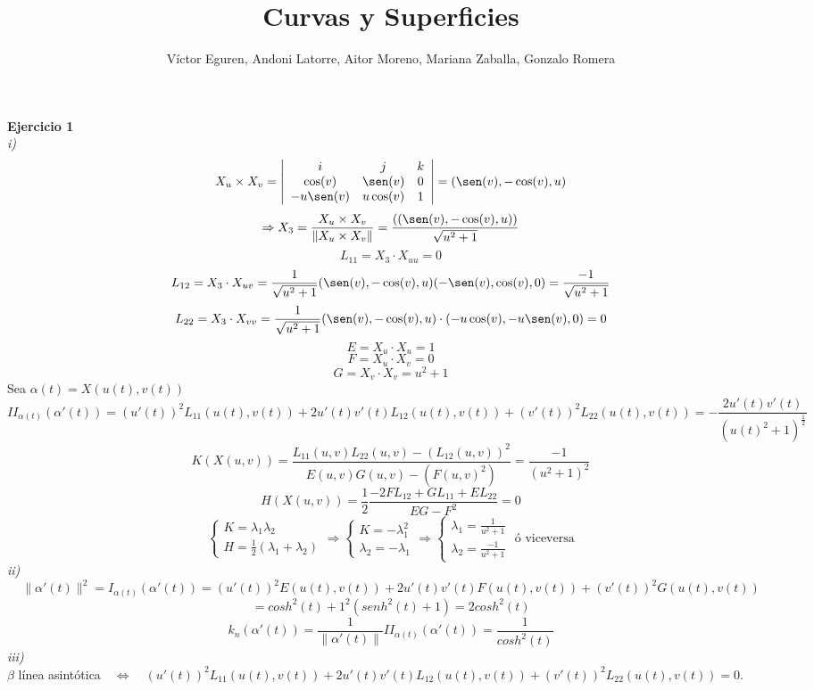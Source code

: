 \documentclass{article}
\title{Curvas y Superficies}
\author{Víctor Eguren, Andoni Latorre, Aitor Moreno, Mariana Zaballa, Gonzalo Romera}
\date{}
\begin{document}
\maketitle

\textbf{Ejercicio 1}\\
\textit{i)}
$$
X_u \times X_v = \left|\begin{array}{ccc}
    i & j & k \\
    \cos(v) & \sen(v) & 0 \\
    -u\sen(v) & u\cos(v) & 1    
\end{array}\right| = (\sen(v), -\cos(v),u)
$$
$$
\Rightarrow X_3 = \frac{X_u\times X_v}{\| X_u \times X_v\|} = \frac{((\sen(v), -\cos(v),u))}{\sqrt{u^2+1}}
$$
$$
L_{11} = X_3\cdot X_{uu} = 0
$$
$$
L_{12} = X_3\cdot X_{uv} = \frac{1}{\sqrt{u^2+1}} (\sen(v), -\cos(v),u) (-\sen(v), \cos(v), 0) = \frac{-1}{\sqrt{u^2+1}}
$$
$$
L_{22} = X_3\cdot X_{vv} = \frac{1}{\sqrt{u^2+1}} (\sen(v), -\cos(v),u) \cdot (-u\cos(v),-u\sen(v),0) = 0
$$
$$
E = X_u \cdot X_u = 1
$$
$$
F = X_u \cdot X_v = 0
$$
$$
G = X_v \cdot X_v = u^2 + 1
$$
Sea $\alpha(t)=X(u(t),v(t))$
$$
II_{\alpha(t)}(\alpha'(t))=(u'(t))^2L_{11}(u(t),v(t))+2u'(t)v'(t)L_{12}(u(t),v(t))+(v'(t))^2L_{22}(u(t),v(t))
= - \frac{2 u'(t) v'(t)}{(u(t)^2 +1)^{\frac{1}{2}}}
$$
$$
K(X(u,v))= \frac{L_{11}(u,v)L_{22}(u,v)-(L_{12}(u,v))^2}{E(u,v)G(u,v)-(F(u,v)^2)} = \frac{-1}{(u^2+1)^2}
$$
$$
H(X(u,v))= \frac{1}{2} \frac{-2FL_{12}+GL_{11}+EL_{22}}{EG-F^2}=0
$$
$$
\left\{\begin{array}{l}
    K=\lambda_1\lambda_2 \\
    H = \frac{1}{2}(\lambda_1+\lambda_2)
\end{array}\right.
\Rightarrow
\left\{ \begin{array}{l}
    K=-\lambda_1^2 \\
    \lambda_2 = - \lambda_1
\end{array}\right.
\Rightarrow
\left\{ \begin{array}{l}
    \lambda_1 = \frac{1}{u^2+1} \\
    \lambda_2 = \frac{-1}{u^2+1}
\end{array}\right.
\text{ ó viceversa}
$$
\textit{ii)}
$$
\|\alpha'(t)\|^2 = I_{\alpha(t)}(\alpha'(t)) = (u'(t))^2E(u(t),v(t))+2u'(t)v'(t)F(u(t),v(t))+(v'(t))^2 G(u(t),v(t))
$$
$$
= cosh^2(t)+1^2(senh^2(t)+1)=2cosh^2(t)
$$
$$
k_n(\alpha'(t))=\frac{1}{\|\alpha'(t)\|} II_{\alpha(t)} (\alpha'(t))=\frac{1}{cosh^2(t)}
$$
\textit{iii)}\\
$\beta$ línea asintótica$\quad \Leftrightarrow \quad (u'(t))^2L_{11}(u(t),v(t))+2u'(t)v'(t)L_{12}(u(t),v(t))+(v'(t))^2L_{22}(u(t),v(t)) = 0$.
\end{document}
